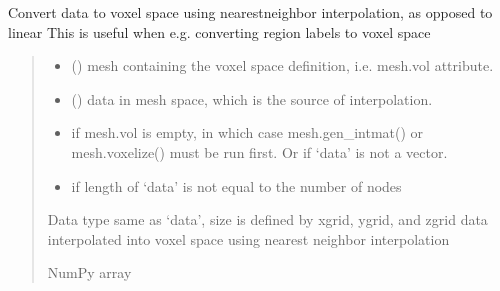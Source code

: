 \documentclass[letterpaper,10pt,english]{sphinxmanual}
\begin{document}
\begin{fulllineitems}
\label{\detokenize{_autosummary/nirfasterff.utils.nntogrid:nirfasterff.utils.nntogrid}}
\pysigstartsignatures
\pysiglinewithargsret
{}
{\sphinxparamcomma {}}
{}
\pysigstopsignatures
\sphinxAtStartPar
Convert data to voxel space using nearest\sphinxhyphen{}neighbor interpolation, as opposed to linear
This is useful when e.g. converting region labels to voxel space
\begin{quote}\begin{description}
\begin{itemize}
\item {} 
\sphinxAtStartPar
{} () \textendash{} mesh containing the voxel space definition, i.e. mesh.vol attribute.

\item {} 
\sphinxAtStartPar
{} () \textendash{} data in mesh space, which is the source of interpolation.

\end{itemize}

\begin{itemize}
\item {} 
\sphinxAtStartPar
{} \textendash{} if mesh.vol is empty, in which case mesh.gen\_intmat() or mesh.voxelize() must be run first.
    Or if ‘data’ is not a vector.

\item {} 
\sphinxAtStartPar
{} \textendash{} if length of ‘data’ is not equal to the number of nodes

\end{itemize}

\sphinxAtStartPar
Data type same as ‘data’, size is defined by xgrid, ygrid, and zgrid
data interpolated into voxel space using nearest neighbor interpolation

\sphinxAtStartPar
NumPy array

\end{description}\end{quote}

\end{fulllineitems}
\end{document}
